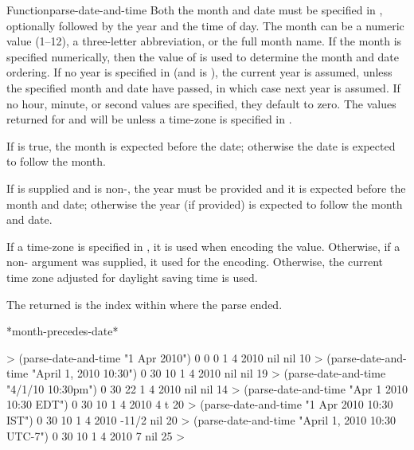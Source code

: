 \documentclass[10pt,twoside,english,pdftex]{article}
\begin{document}
\begin{functiondoc}{Function}{parse-date-and-time}
\fndescription
%
Both the month and date must be specified in , optionally followed
by the year and the time of day. The month can be a numeric value (1--12), a
three-letter abbreviation, or the full month name.  If the month is specified
numerically, then the value of  is used to
determine the month and date ordering. If no year is specified in 
(and  is \nil), the current year is assumed, unless the
specified month and date have passed, in which case next year is assumed.  If
no hour, minute, or second values are specified, they default to zero.  The
values returned for  and 
will be \nil{} unless a time-zone is specified in .

\W{} 
%
If  is true, the month is expected before the date;
otherwise the date is expected to follow the month.

\W{} 
%
If  is supplied and is non-\nil, the year must be provided
and it is expected before the month and date; otherwise the year (if provided)
is expected to follow the month and date.

\W{} 
%
If a time-zone is specified in , it is used when encoding the
 value.  Otherwise, if a non-\nil{}
 argument was supplied, it used for the encoding.
Otherwise, the current time zone adjusted for daylight saving time is used.

The returned  is the index within  where the
parse ended.

\begin{alsos}{*month-precedes-date*}
\end{alsos}

\fnexamples
%
\W\supp
\begin{example}
  > (parse-date-and-time "1 Apr 2010")
  0
  0
  0
  1
  4
  2010
  nil
  nil
  10\goodpagebreak
  > (parse-date-and-time "April 1, 2010 10:30")
  0
  30
  10
  1
  4
  2010
  nil
  nil
  19\goodpagebreak
  > (parse-date-and-time "4/1/10 10:30pm")
  0
  30
  22
  1
  4
  2010
  nil
  nil
  14\goodpagebreak
  > (parse-date-and-time "Apr 1 2010 10:30 EDT")
  0
  30
  10
  1
  4
  2010
  4
  t
  20\goodpagebreak
  > (parse-date-and-time "1 Apr 2010 10:30 IST")
  0
  30
  10
  1
  4
  2010
  -11/2
  nil
  20\goodpagebreak
  > (parse-date-and-time "April 1, 2010 10:30 UTC-7")
  0
  30
  10
  1
  4
  2010
  7
  nil
  25
  >
\end{example}

\end{functiondoc}
\end{document}
